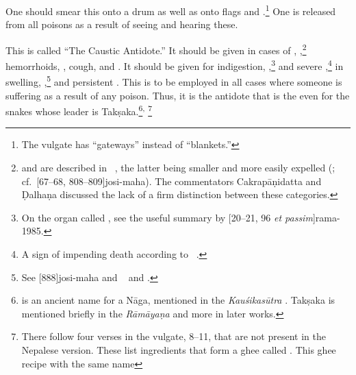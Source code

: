 \begin{translation}
\item[4]    

One should smear this onto a drum as well as onto flags and
.\footnote{The vulgate has  “gateways”
    instead of  “blankets.”} One is released from all
    poisons as a result of seeing and hearing these.    

\item[5--7]

This is called “The Caustic Antidote.” It should be given in cases of
, ,\footnote{ and  are described in
    \SS\ , the latter being smaller and more easily
    expelled (;  cf.\ [67--68,
    808--809]{josi-maha}). The commentators Cakrapāṇidatta and Ḍalhaṇa
    discussed the lack of a firm distinction between these categories.}
    hemorrhoids, , cough,
     and .  It should
    be given for indigestion, ,\footnote{On the organ called , see the useful
        summary by [20--21, 96 \emph{et passim}]{rama-1985}.} 
        and
        severe ,\footnote{A sign of 
        impending death according to \SS\ .} in swelling,
        ,\footnote{See [888]{josi-maha} 
        and \SS\  and .} and persistent 
        . %
        This is to be employed in all cases where someone is suffering as
        a result of any poison.  Thus, it is the antidote that is  the
         even for the snakes
        whose leader is Takṣaka.\footnote{ is an ancient
            name for a Nāga, mentioned in the \emph{Kauśikasūtra} \citep[28.1
            \emph{et passim},][78]{bloo-1890}. Takṣaka is mentioned briefly
            in the \emph{Rāmāyaṇa} \citep[292, n.\,13]{poll-1991} and more in
            later works.}\textsuperscript{, }\footnote{There follow four
                verses in the vulgate, 8--11, that are not present in the
                Nepalese version.  These list ingredients that form a ghee called
                . This ghee recipe with the same name
}
\end{translation}
